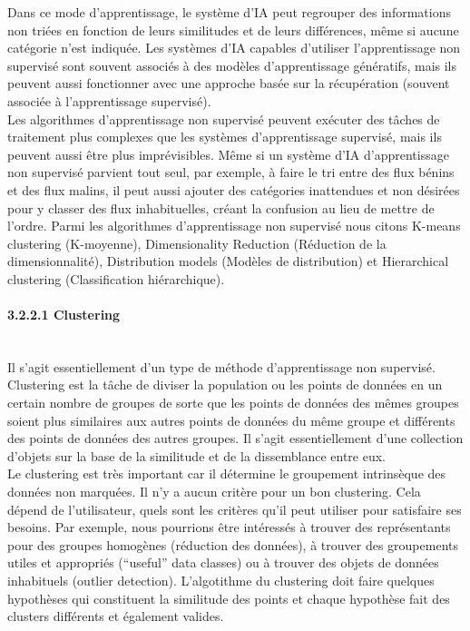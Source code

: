 \noindent Dans ce mode d'apprentissage, le système d'IA peut regrouper des informations non triées en fonction de leurs similitudes et de leurs différences, même si aucune catégorie n'est indiquée. Les systèmes d'IA capables d'utiliser l'apprentissage non supervisé sont souvent associés à des modèles d'apprentissage génératifs, mais ils peuvent aussi fonctionner avec une approche basée sur la récupération (souvent associée à l'apprentissage supervisé).\\

\noindent Les algorithmes d'apprentissage non supervisé peuvent exécuter des tâches de traitement plus complexes que les systèmes d'apprentissage supervisé, mais ils peuvent aussi être plus imprévisibles. Même si un système d'IA d'apprentissage non supervisé parvient tout seul, par exemple, à faire le tri entre des flux bénins et des flux malins, il peut aussi ajouter des catégories inattendues et non désirées pour y classer des flux inhabituelles, créant la confusion au lieu de mettre de l'ordre.
Parmi les algorithmes d’apprentissage non supervisé nous citons K-means clustering (K-moyenne), Dimensionality Reduction (Réduction de la dimensionnalité), Distribution models (Modèles de distribution) et Hierarchical clustering (Classification hiérarchique).\\

\newpage
\paragraph{{\large 3.2.2.1 Clustering}\\\\}
Il s'agit essentiellement d'un type de méthode d'apprentissage non supervisé. Clustering est la tâche de diviser la population ou les points de données en un certain nombre de groupes de sorte que les points de données des mêmes groupes soient plus similaires aux autres points de données du même groupe et différents des points de données des autres groupes. Il s'agit essentiellement d'une collection d'objets sur la base de la similitude et de la dissemblance entre eux.\\

\noindent Le clustering est très important car il détermine le groupement intrinsèque des données non marquées. Il n'y a aucun critère pour un bon clustering. Cela dépend de l'utilisateur, quels sont les critères qu'il peut utiliser pour satisfaire ses besoins. Par exemple, nous pourrions être intéressés à trouver des représentants pour des groupes homogènes (réduction des données), à trouver des groupements utiles et appropriés (“useful” data classes) ou à trouver des objets de données inhabituels (outlier detection). L'algotithme du clustering doit faire quelques hypothèses qui constituent la similitude des points et chaque hypothèse fait des clusters différents et également valides. 

